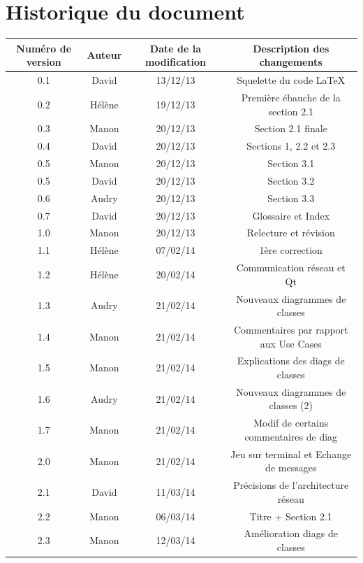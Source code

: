 \documentclass[a4paper,titlepage]{scrreprt}
\begin{document}
\section{Historique du document}
  \begin{tabular}{|c|c|c|c|}
    \hline
    Numéro de version & Auteur & Date de la modification & Description des changements \\
    \hline
    0.1 & David & 13/12/13 & Squelette du code \LaTeX \\
    0.2 & Hélène & 19/12/13 & Première ébauche de la section 2.1 \\
    0.3 & Manon & 20/12/13 & Section 2.1 finale \\
    0.4 & David & 20/12/13 & Sections 1,  2.2 et 2.3 \\
    0.5 & Manon & 20/12/13 & Section 3.1 \\
    0.5 & David & 20/12/13 & Section 3.2 \\
    0.6 & Audry & 20/12/13 & Section 3.3 \\
    0.7 & David & 20/12/13 & Glossaire et Index \\
    1.0 & Manon & 20/12/13 & Relecture et révision \\
    1.1 & Hélène & 07/02/14 & 1ère correction \\
    1.2 & Hélène & 20/02/14 & Communication réseau et Qt \\    
    1.3 & Audry & 21/02/14 & Nouveaux diagrammes de classes \\
    1.4 & Manon & 21/02/14 & Commentaires par rapport aux Use Cases \\
    1.5 & Manon & 21/02/14 & Explications des diags de classes \\
    1.6 & Audry & 21/02/14 & Nouveaux diagrammes de classes (2) \\
    1.7 & Manon & 21/02/14 & Modif de certains commentaires de diag \\
    2.0 & Manon & 21/02/14 & Jeu sur terminal et Echange de messages \\
    2.1 & David & 11/03/14 & Précisions de l'architecture réseau \\
    2.2 & Manon & 06/03/14 & Titre + Section 2.1 \\
    2.3 & Manon & 12/03/14 & Amélioration diags de classes \\

\end{tabular}
\end{document}
